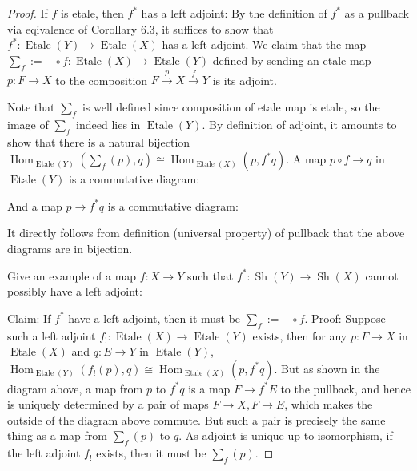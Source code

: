\documentclass[a4paper]{article}
\DeclareMathOperator{\Hom}{\text {Hom}}
\DeclareMathOperator{\Sh}{\text {Sh}}
\DeclareMathOperator{\Et}{\text {Etale}}
\begin{document}
\begin{proof}
    If $f$ is etale, then $f^*$ has a left adjoint:
    By the definition of $f^*$ as a pullback via eqivalence of Corollary 6.3, it suffices to show that $f^*:\Et (Y)\to \Et(X)$ has a left adjoint. We claim that the map $\sum_f:=-\circ f:\Et(X)\to \Et(Y)$ defined by sending an etale map $p:F\to X$ to the composition $F\overset{p}\to X\overset{f}\to Y$ is its adjoint.
    \begin{center}
    \end{center}
    Note that $\sum_f$ is well defined since composition of etale map is etale, so the image of $\sum_f$ indeed lies in $\Et(Y)$.
    By definition of adjoint, it amounts to show that there is a natural bijection $\Hom_{\Et(Y)}(\sum_f(p),q)\cong\Hom_{\Et(X)}(p,f^*q)$. A map $p\circ f\to q$ in $\Et (Y)$ is a commutative diagram:
    \begin{center}
    \end{center}
    And a map $p\to f^*q$ is a commutative diagram:
    \begin{center}
    \end{center}
    It directly follows from definition (universal property) of pullback that the above diagrams are in bijection.
    \begin{center}
    \end{center}

    Give an example of a map $f:X\to Y$ such that $f^*:\Sh(Y)\to \Sh(X)$ cannot possibly have a left adjoint:

    Claim: If $f^*$ have a left adjoint, then it must be $\sum_f:= -\circ f$.\newline
    Proof: 
    Suppose such a left adjoint $f_!:\Et(X)\to \Et(Y)$ exists, then for any $p:F\to X$ in $\Et(X)$ and $q:E\to Y$ in $\Et(Y)$, $\Hom_{\Et(Y)}(f_!(p),q)\cong \Hom_{\Et(X)}(p,f^*q)$. But as shown in the diagram above, a map from $p$ to $f^*q$ is a map $F\to f^*E$ to the pullback, and hence is uniquely determined by a pair of maps $F\to X,F\to E$, which makes the outside of the diagram above commute. 
    But such a pair is precisely the same thing as a map from $\sum_f(p)$ to $q$. As adjoint is unique up to isomorphism, if the left adjoint $f_!$ exists, then it must be $\sum_f(p)$.



\end{proof}
\end{document}

